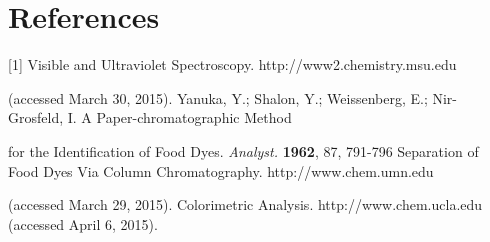 \documentclass[12pt]{article}
\begin{document}
\section*{References}
[1]\hspace{4ex} Visible and Ultraviolet Spectroscopy. http://www2.chemistry.msu.edu

\hspace{12ex}(accessed March 30, 2015).
\vspace{6pt}\newline
[2]\hspace{4ex}Yanuka, Y.; Shalon, Y.; Weissenberg, E.; Nir-Grosfeld, I. A Paper-chromatographic Method 

\hspace{12ex}for the Identification of Food Dyes. \textit{Analyst.} \textbf{1962}, 87, 791-796\newline
[3]\hspace{4ex} Separation of Food Dyes Via Column Chromatography. http://www.chem.umn.edu

\hspace{12ex}(accessed March 29, 2015).\newline
[4]\hspace{4ex} Colorimetric Analysis. http://www.chem.ucla.edu (accessed April 6, 2015).
\end{document}
